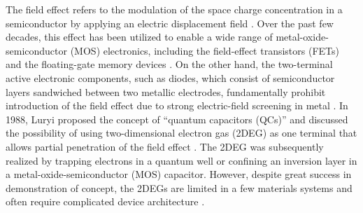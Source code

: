 The field effect refers to the modulation of the space charge concentration in a semiconductor by applying an electric displacement field \cite{Sze2006Mosfets}.
Over the past few decades, this effect has been utilized to enable a wide range of metal-oxide-semiconductor (MOS) electronics, including the field-effect transistors (FETs) and the floating-gate memory devices \cite{Sze2006Mosfets}.
On the other hand, the two-terminal active electronic components, such as diodes, which consist of semiconductor layers sandwiched between two metallic electrodes, fundamentally prohibit introduction of the field effect due to strong electric-field screening in metal \cite{ehrenreich2001solid}. 
In 1988, Luryi proposed the concept of ``quantum capacitors (QCs)'' and discussed the possibility of using two-dimensional electron gas (2DEG) as one terminal that allows partial penetration of the field effect \cite{Luryi1988Quantum}.
The 2DEG was subsequently realized by trapping electrons in a quantum well \cite{Davies1997Physics} or confining an inversion layer in a metal-oxide-semiconductor (MOS) capacitor\cite{Sze2006Mosfets}.
However, despite great success in demonstration of concept, the 2DEGs are limited in a few materials systems and often require complicated device architecture \cite{stormer1979two}.

